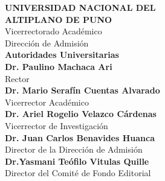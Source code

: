 \begin{titlepage}
	
	\centering
	{\Large \bfseries UNIVERSIDAD NACIONAL DEL}\\[0.1cm]
		 {\Large \bfseries ALTIPLANO DE PUNO}\\[0.1cm]
	{\large Vicerrectorado Académico}\\[0.1cm]
	{\large Dirección de Admisión}\\[1.2cm]
	
	
	{\Huge \bfseries Autoridades Universitarias}\\[1.2cm]
	
	

	
	{\normalsize
		\textbf{Dr. Paulino Machaca Ari}\\
		Rector\\[0.4cm]

		\textbf{Dr. Mario Serafín Cuentas Alvarado}\\
		Vicerrector Académico\\[0.4cm]

		\textbf{Dr. Ariel Rogelio Velazco Cárdenas}\\
		Vicerrector de Investigación\\[0.4cm]

		\textbf{Dr. Juan Carlos Benavides Huanca}\\
		Director de la Dirección de Admisión\\[0.4cm]
		
		\textbf{Dr.Yasmani Teófilo Vitulas Quille }\\
		Director del Comité de Fondo Editorial\\[0.4cm]
	}


\end{titlepage}
























\clearpage
\thispagestyle{empty}

